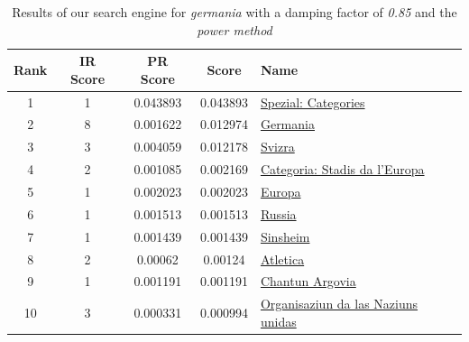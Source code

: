 \documentclass[pdftex,12pt,a4paper]{article}
\begin{document}
\begin{table}[H]
\centering
\begin{tabular}{ | c | c | c | c | l | }
\hline
Rank & IR Score & PR Score &  Score & Name \\ \hline
1 & 1 & 0.043893 & 0.043893 & \href{http://rm.wikipedia.org/wiki/Spezial:Categories}{Spezial: Categories} \\ \hline
2 & 8 & 0.001622 & 0.012974 & \href{http://rm.wikipedia.org/wiki/Germania}{Germania} \\ \hline
3 & 3 & 0.004059 & 0.012178 & \href{http://rm.wikipedia.org/wiki/Svizra}{Svizra} \\ \hline
4 & 2 & 0.001085 & 0.002169 & \href{http://rm.wikipedia.org/wiki/Categoria:Stadis_da_l'Europa}{Categoria: Stadis da l'Europa} \\ \hline
5 & 1 & 0.002023 & 0.002023 & \href{http://rm.wikipedia.org/wiki/Europa}{Europa} \\ \hline
6 & 1 & 0.001513 & 0.001513 & \href{http://rm.wikipedia.org/wiki/Russia}{Russia} \\ \hline
7 & 1 & 0.001439 & 0.001439 & \href{http://rm.wikipedia.org/wiki/Sinsheim}{Sinsheim} \\ \hline
8 & 2 & 0.00062 & 0.00124 & \href{http://rm.wikipedia.org/wiki/Atletica}{Atletica} \\ \hline
9 & 1 & 0.001191 & 0.001191 & \href{http://rm.wikipedia.org/wiki/Chantun_Argovia}{Chantun Argovia} \\ \hline
10 & 3 & 0.000331 & 0.000994 & \href{http://rm.wikipedia.org/wiki/Organisaziun_da_las_Naziuns_unidas}{Organisaziun da las Naziuns unidas} \\ \hline
\end{tabular}
\caption{Results of our search engine for \emph{germania} with a damping factor of \emph{0.85} and the \emph{power method}}
\label{table_d=0.85}
\end{table}
\end{document}

